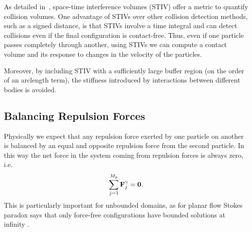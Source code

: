 \documentclass[preprint, 10pt]{elsarticle}
\begin{document}


As detailed in~\cite{Lu2017, Harmon2011}, space-time interference
volumes (STIV) offer a metric to quantify collision volumes. One
advantage of STIVs over other collision detection methods, such as a
signed distance, is that STIVs involve a time integral and can detect
collisions even if the final configuration is contact-free. Thus, even
if one particle passes completely through another, using STIVs we can
compute a contact volume and its response to changes in the velocity of
the particles.

Moreover, by including STIV with a sufficiently large buffer
region (on the order of an arclength term), the stiffness introduced by
interactions between different bodies is avoided. 


\subsection{Balancing Repulsion Forces}


Physically we expect that any repulsion force exerted by one particle on another is balanced by an
equal and opposite repulsion force from the second particle.
In this way the net force in the system coming from repulsion forces is always
zero, i.e.
\begin{equation*}
	\sum\limits_{j=1}^{M_p} {\mathbf{F}}^\gamma_j = \mathbf{0}.
\end{equation*}
This is particularly important for unbounded domains, as for planar flow Stokes
paradox says that only force-free configurations have bounded solutions at
infinity \cite{Power1993, Pozrikidis1992}.
\end{document}
